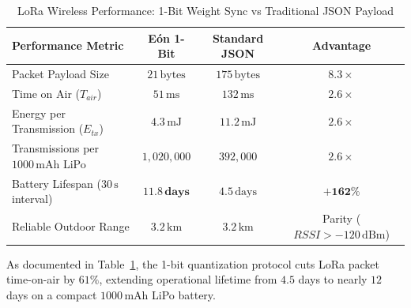 \begin{table}[h]
\centering
\caption{LoRa Wireless Performance: 1-Bit Weight Sync vs Traditional JSON Payload}
\label{tab:energy}
\begin{tabular}{lccc}
\toprule
\textbf{Performance Metric} & \textbf{Eón 1-Bit} & \textbf{Standard JSON} & \textbf{Advantage} \\
\midrule
Packet Payload Size & $21\,\text{bytes}$ & $175\,\text{bytes}$ & $\mathbf{8.3\times}$ \\
Time on Air ($T_{air}$) & $51\,\text{ms}$ & $132\,\text{ms}$ & $\mathbf{2.6\times}$ \\
Energy per Transmission ($E_{tx}$) & $4.3\,\text{mJ}$ & $11.2\,\text{mJ}$ & $\mathbf{2.6\times}$ \\
Transmissions per $1000\,\text{mAh}$ LiPo & $1,020,000$ & $392,000$ & $\mathbf{2.6\times}$ \\
Battery Lifespan ($30\,\text{s}$ interval) & $\mathbf{11.8\,\text{days}}$ & $4.5\,\text{days}$ & $\mathbf{+162\%}$ \\
Reliable Outdoor Range & $3.2\,\text{km}$ & $3.2\,\text{km}$ & Parity ($RSSI > -120\,\text{dBm}$) \\
\bottomrule
\end{tabular}
\end{table}

As documented in Table~\ref{tab:energy}, the 1-bit quantization protocol cuts LoRa packet time-on-air by $61\%$, extending operational lifetime from $4.5$ days to nearly $12$ days on a compact $1000\,\text{mAh}$ LiPo battery.

